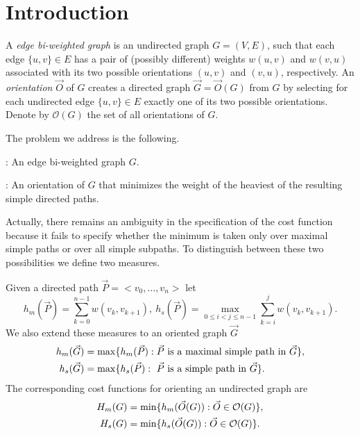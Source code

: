 \section{Introduction}

A \emph{edge bi-weighted graph} is an undirected graph $G = (V, E)$, such that each edge $\{u, v\} \in E$ has a pair of (possibly different) weights $w(u, v)$ and $w(v, u)$ associated with its two possible orientations $(u, v)$ and $(v, u)$, respectively. An \emph{orientation} $ \vec{O}$ of $G$ creates a directed graph $\vec{G}=\vec{O} (G)$ from $G$ by selecting for each undirected edge $\{u, v\} \in E$ exactly one of its two possible orientations. Denote by $\mathcal{O}(G)$ the set of all orientations of $G$. 

The problem we address is the following.

: An edge bi-weighted graph $G$.

: An orientation  of $G$ that minimizes the weight of 
the heaviest of the resulting simple directed paths.

Actually, there remains an ambiguity in the specification of the cost function because it 
fails to specify whether the minimum is taken only over maximal 
simple paths or over all simple subpaths. To distinguish between these two possibilities we define two measures.

\begin{definition}
	Given a directed path $\vec{P}=<v_0,\ldots,v_n>$ let 
\begin{equation}\label{e.h}
h_m(\vec{P})=\sum_{k=0}^{n-1} w(v_k,v_{k+1}),\ 
	h_s(\vec{P})=\max_{0\leq i<j\leq n-1}\sum_{k=i}^{j} w(v_k,v_{k+1}).
\end{equation}
	We also extend these measures to an oriented graph $\vec{G}$
	\begin{align} 
	h_m(\vec{G})&=\max\{h_m(\vec{P}): \vec{P} \mbox{ is a maximal simple path in }\vec{G} \},\\
	h_s(\vec{G})&=\max\{h_s(\vec{P}):\ \vec{P} \mbox{ is a simple path in }\vec{G} \}.
\end{align}
The corresponding cost functions for orienting an undirected graph are 
\begin{align}
H_m(G)&=\min\{h_m(\vec{O}(G)): \vec{O} \in \mathcal{O}(G)\},\\
H_s(G)&=\min\{h_s(\vec{O}(G)): \vec{O} \in \mathcal{O}(G)\}.
\end{align}
\end{definition}

